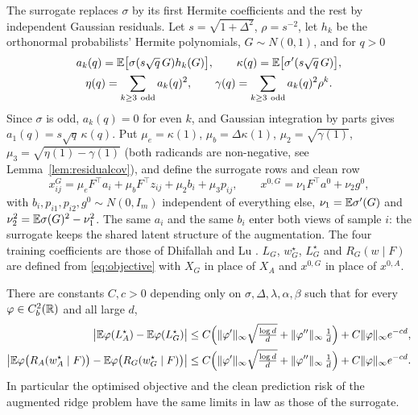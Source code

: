 The surrogate replaces $\sigma$ by its first Hermite coefficients and the rest by independent Gaussian
residuals. Let $s=\sqrt{1+\Delta^2}$, $\rho=s^{-2}$, let $h_k$ be the orthonormal probabilists' Hermite
polynomials, $G\sim N(0,1)$, and for $q>0$
\begin{equation}
\begin{gathered}
a_k(q)=\E\big[\sigma(s\sqrt q\,G)h_k(G)\big],\qquad \kappa(q)=\E\big[\sigma'(s\sqrt q\,G)\big],\\
\eta(q)=\sum_{k\ge3\ \mathrm{odd}}a_k(q)^2,\qquad \gamma(q)=\sum_{k\ge3\ \mathrm{odd}}a_k(q)^2\rho^k .
\end{gathered}
\label{eq:hermitecoef}
\end{equation}
Since $\sigma$ is odd, $a_k(q)=0$ for even $k$, and Gaussian integration by parts gives
$a_1(q)=s\sqrt q\,\kappa(q)$. Put $\mu_e=\kappa(1)$, $\mu_b=\Delta\kappa(1)$, $\mu_2=\sqrt{\gamma(1)}$,
$\mu_3=\sqrt{\eta(1)-\gamma(1)}$ (both radicands are non-negative, see Lemma~\ref{lem:residualcov}), and
define the surrogate rows and clean row
\begin{equation}
x^G_{ij}=\mu_eF^\top a_i+\mu_bF^\top z_{ij}+\mu_2b_i+\mu_3p_{ij},\qquad
x^{0,G}=\nu_1F^\top a^0+\nu_2g^0,
\label{eq:surrogate}
\end{equation}
with $b_i,p_{i1},p_{i2},g^0\sim N(0,I_m)$ independent of everything else, $\nu_1=\mathbb{E}\sigma'(G)$ and
$\nu_2^2=\mathbb{E}\sigma(G)^2-\nu_1^2$. The same $a_i$ and the same $b_i$ enter both views of sample $i$: the
surrogate keeps the shared latent structure of the augmentation. The four training coefficients are those
of Dhifallah and Lu \cite{DhifallahLu}. $L_G$, $w_G^\star$, $L_G^\star$ and $R_G(w\mid F)$ are defined from
\eqref{eq:objective} with $X_G$ in place of $X_A$ and $x^{0,G}$ in place of $x^{0,A}$.

\begin{theorem}[Target 1]\label{thm:T1}
There are constants $C,c>0$ depending only on $\sigma,\Delta,\lambda,\alpha,\beta$ such that for every
$\varphi\in C^2_b(\mathbb{R})$ and all large $d$,
\begin{align}
\big|\mathbb{E}\varphi(L_A^\star)-\mathbb{E}\varphi(L_G^\star)\big|
&\le C\Big(\|\varphi'\|_\infty\sqrt{\tfrac{\log d}{d}}+\|\varphi''\|_\infty\,\tfrac1d\Big)+C\|\varphi\|_\infty e^{-cd},
\label{eq:T1a}\\
\big|\mathbb{E}\varphi\big(R_A(w_A^\star\mid F)\big)-\mathbb{E}\varphi\big(R_G(w_G^\star\mid F)\big)\big|
&\le C\Big(\|\varphi'\|_\infty\sqrt{\tfrac{\log d}{d}}+\|\varphi''\|_\infty\,\tfrac1d\Big)+C\|\varphi\|_\infty e^{-cd}.
\label{eq:T1b}
\end{align}
In particular the optimised objective and the clean prediction risk of the augmented ridge problem have
the same limits in law as those of the surrogate.
\end{theorem}

